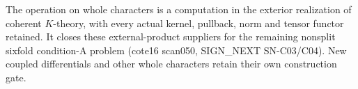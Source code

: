The operation on whole characters is a computation in the
exterior realization of coherent \(K\)-theory, with every
actual kernel, pullback, norm and tensor functor retained.
It closes these external-product suppliers for the remaining
nonsplit sixfold condition-A problem (cote16 scan050,
SIGN\_NEXT SN-C03/C04). New coupled differentials and
other whole characters retain their own construction gate.
